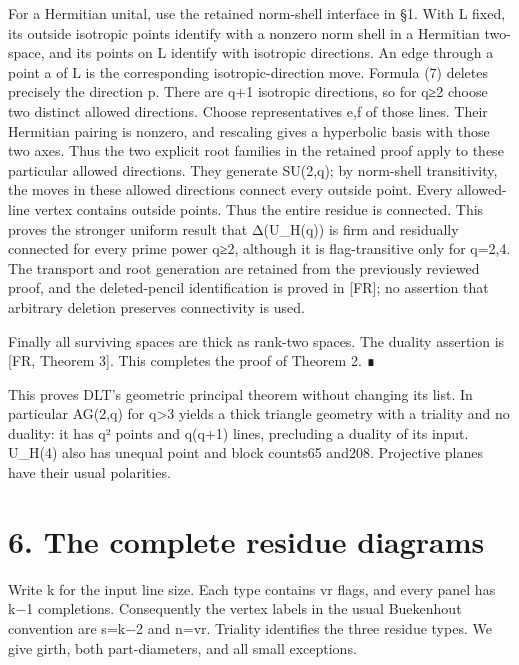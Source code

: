 \documentclass[
  11pt,
  a4paper,
]{article}
\begin{document}
For a Hermitian unital, use the retained norm-shell interface in §1.
With L fixed, its outside isotropic points identify with a nonzero norm
shell in a Hermitian two-space, and its points on L identify with
isotropic directions. An edge through a point a of L is the
corresponding isotropic-direction move. Formula (7) deletes precisely
the direction p. There are q+1 isotropic directions, so for q≥2 choose
two distinct allowed directions. Choose representatives e,f of those
lines. Their Hermitian pairing is nonzero, and rescaling gives a
hyperbolic basis with those two axes. Thus the two explicit root
families in the retained proof apply to these particular allowed
directions. They generate SU(2,q); by norm-shell transitivity, the moves
in these allowed directions connect every outside point. Every
allowed-line vertex contains outside points. Thus the entire residue is
connected. This proves the stronger uniform result that Δ(U\_H(q)) is
firm and residually connected for every prime power q≥2, although it is
flag-transitive only for q=2,4. The transport and root generation are
retained from the previously reviewed proof, and the deleted-pencil
identification is proved in {[}FR{]}; no assertion that arbitrary
deletion preserves connectivity is used.

Finally all surviving spaces are thick as rank-two spaces. The duality
assertion is {[}FR, Theorem 3{]}. This completes the proof of Theorem 2.
∎

This proves DLT's geometric principal theorem without changing its list.
In particular AG(2,q) for q\textgreater3 yields a thick triangle
geometry with a triality and no duality: it has q² points and q(q+1)
lines, precluding a duality of its input. U\_H(4) also has unequal point
and block counts65 and208. Projective planes have their usual
polarities.

\section{6. The complete residue
diagrams}\label{the-complete-residue-diagrams}

Write k for the input line size. Each type contains vr flags, and every
panel has k−1 completions. Consequently the vertex labels in the usual
Buekenhout convention are s=k−2 and n=vr. Triality identifies the three
residue types. We give girth, both part-diameters, and all small
exceptions.
\end{document}
